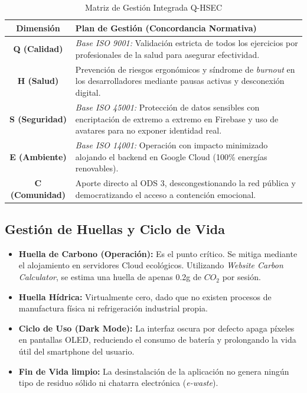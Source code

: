 \documentclass[12pt,letterpaper]{article}
\begin{document}
\begin{table}[H]
\centering
\caption{Matriz de Gestión Integrada Q-HSEC}
\begin{tabularx}{\textwidth}{c X}
\toprule
\textbf{Dimensión} & \textbf{Plan de Gestión (Concordancia Normativa)} \\
\midrule
\textbf{Q (Calidad)} & \textit{Base ISO 9001:} Validación estricta de todos los ejercicios por profesionales de la salud para asegurar efectividad. \\
\textbf{H (Salud)} & Prevención de riesgos ergonómicos y síndrome de \textit{burnout} en los desarrolladores mediante pausas activas y desconexión digital. \\
\textbf{S (Seguridad)} & \textit{Base ISO 45001:} Protección de datos sensibles con encriptación de extremo a extremo en Firebase y uso de avatares para no exponer identidad real. \\
\textbf{E (Ambiente)} & \textit{Base ISO 14001:} Operación con impacto minimizado alojando el backend en Google Cloud (100\% energías renovables). \\
\textbf{C (Comunidad)} & Aporte directo al ODS 3, descongestionando la red pública y democratizando el acceso a contención emocional. \\
\bottomrule
\end{tabularx}
\end{table}

\subsection{Gestión de Huellas y Ciclo de Vida}
\begin{itemize}[leftmargin=*]
    \item \textbf{Huella de Carbono (Operación):} Es el punto crítico. Se mitiga mediante el alojamiento en servidores Cloud ecológicos. Utilizando \textit{Website Carbon Calculator}, se estima una huella de apenas 0.2g de $CO_2$ por sesión.
    \item \textbf{Huella Hídrica:} Virtualmente cero, dado que no existen procesos de manufactura física ni refrigeración industrial propia.
    \item \textbf{Ciclo de Uso (Dark Mode):} La interfaz oscura por defecto apaga píxeles en pantallas OLED, reduciendo el consumo de batería y prolongando la vida útil del smartphone del usuario.
    \item \textbf{Fin de Vida limpio:} La desinstalación de la aplicación no genera ningún tipo de residuo sólido ni chatarra electrónica (\textit{e-waste}).
\end{itemize}
\end{document}
